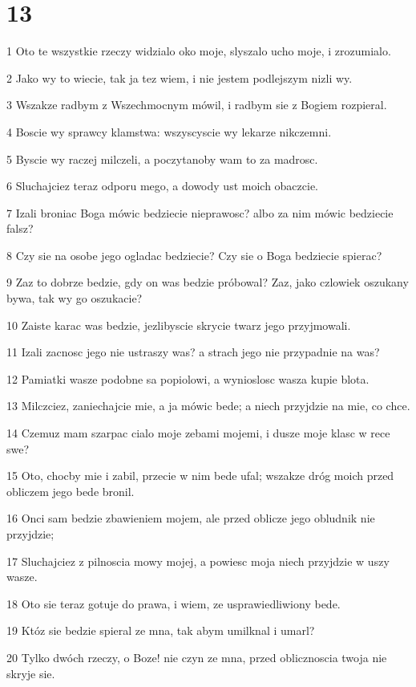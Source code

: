 \chapter{13}

\par 1 Oto te wszystkie rzeczy widzialo oko moje, slyszalo ucho moje, i zrozumialo.
\par 2 Jako wy to wiecie, tak ja tez wiem, i nie jestem podlejszym nizli wy.
\par 3 Wszakze radbym z Wszechmocnym mówil, i radbym sie z Bogiem rozpieral.
\par 4 Boscie wy sprawcy klamstwa: wszyscyscie wy lekarze nikczemni.
\par 5 Byscie wy raczej milczeli, a poczytanoby wam to za madrosc.
\par 6 Sluchajciez teraz odporu mego, a dowody ust moich obaczcie.
\par 7 Izali broniac Boga mówic bedziecie nieprawosc? albo za nim mówic bedziecie falsz?
\par 8 Czy sie na osobe jego ogladac bedziecie? Czy sie o Boga bedziecie spierac?
\par 9 Zaz to dobrze bedzie, gdy on was bedzie próbowal? Zaz, jako czlowiek oszukany bywa, tak wy go oszukacie?
\par 10 Zaiste karac was bedzie, jezlibyscie skrycie twarz jego przyjmowali.
\par 11 Izali zacnosc jego nie ustraszy was? a strach jego nie przypadnie na was?
\par 12 Pamiatki wasze podobne sa popiolowi, a wynioslosc wasza kupie blota.
\par 13 Milczciez, zaniechajcie mie, a ja mówic bede; a niech przyjdzie na mie, co chce.
\par 14 Czemuz mam szarpac cialo moje zebami mojemi, i dusze moje klasc w rece swe?
\par 15 Oto, chocby mie i zabil, przecie w nim bede ufal; wszakze dróg moich przed obliczem jego bede bronil.
\par 16 Onci sam bedzie zbawieniem mojem, ale przed oblicze jego obludnik nie przyjdzie;
\par 17 Sluchajciez z pilnoscia mowy mojej, a powiesc moja niech przyjdzie w uszy wasze.
\par 18 Oto sie teraz gotuje do prawa, i wiem, ze usprawiedliwiony bede.
\par 19 Któz sie bedzie spieral ze mna, tak abym umilknal i umarl?
\par 20 Tylko dwóch rzeczy, o Boze! nie czyn ze mna, przed oblicznoscia twoja nie skryje sie.

